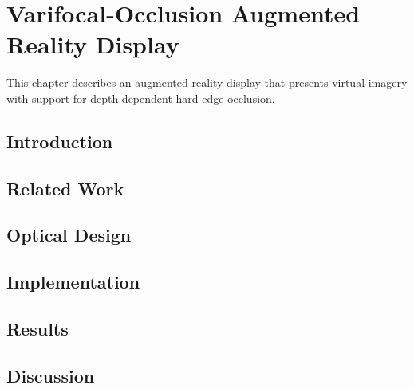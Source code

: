 \chapter[Varifocal-Occlusion Augmented Reality Display]{Varifocal-Occlusion Augmented Reality Display\footnotemark}
\label{chapter:varifocal_occlusion_ned}

This chapter describes an augmented reality display that presents virtual imagery with support for depth-dependent hard-edge occlusion. 

\section{Introduction}
\label{sec:varifocal_occlusion:introduction}


\section{Related Work}
\label{sec:varifocal_occlusion:related}


\section{Optical Design}
\label{sec:varifocal_occlusion:design}


\section{Implementation}
\label{sec:varifocal_occlusion:implementation}


\section{Results}
\label{sec:varifocal_occlusion:results}


\section{Discussion}
\label{sec:varifocal_occlusion:discussion}

